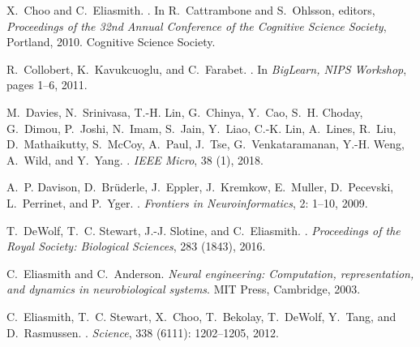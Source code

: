 \documentclass{article}
\begin{document}
\begin{thebibliography}{29}
X.~Choo and C.~Eliasmith.
.
\newblock In R.~Cattrambone and S.~Ohlsson, editors, \emph{{Proceedings of the
  32nd Annual Conference of the Cognitive Science Society}}, Portland, 2010.
  Cognitive Science Society.

R.~Collobert, K.~Kavukcuoglu, and C.~Farabet.
.
\newblock In \emph{{BigLearn, NIPS Workshop}}, pages 1--6, 2011.

M.~Davies, N.~Srinivasa, T.-H. Lin, G.~Chinya, Y.~Cao, S.~H. Choday, G.~Dimou,
  P.~Joshi, N.~Imam, S.~Jain, Y.~Liao, C.-K. Lin, A.~Lines, R.~Liu,
  D.~Mathaikutty, S.~McCoy, A.~Paul, J.~Tse, G.~Venkataramanan, Y.-H. Weng,
  A.~Wild, and Y.~Yang.
.
\newblock \emph{IEEE Micro}, 38 (1), 2018.

A.~P. Davison, D.~Br{\"{u}}derle, J.~Eppler, J.~Kremkow, E.~Muller,
  D.~Pecevski, L.~Perrinet, and P.~Yger.
.
\newblock \emph{Frontiers in Neuroinformatics}, 2: 1--10, 2009.

T.~DeWolf, T.~C. Stewart, J.-J. Slotine, and C.~Eliasmith.
.
\newblock \emph{Proceedings of the Royal Society: Biological Sciences},
  283 (1843), 2016.

C.~Eliasmith and C.~Anderson.
\newblock \emph{{Neural engineering: Computation, representation, and dynamics
  in neurobiological systems}}.
\newblock MIT Press, Cambridge, 2003.

C.~Eliasmith, T.~C. Stewart, X.~Choo, T.~Bekolay, T.~DeWolf, Y.~Tang, and
  D.~Rasmussen.
.
\newblock \emph{Science}, 338 (6111): 1202--1205, 2012.


\end{thebibliography}
\end{document}
